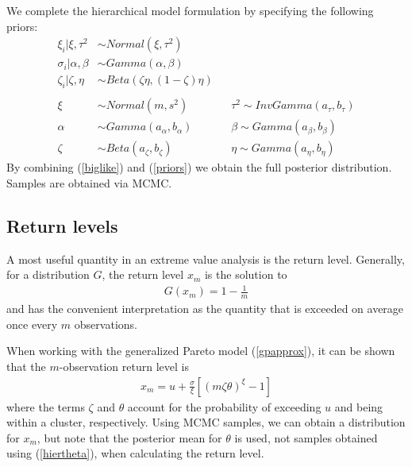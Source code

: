 \documentclass[12pt]{article}
\begin{document}
We complete the hierarchical model formulation by specifying the following priors:
\begin{align}
\xi_i|\xi, \tau^2  &\sim Normal(\xi, \tau^2) \nonumber \\
\sigma_i|\alpha, \beta &\sim Gamma(\alpha, \beta) \nonumber \\
\zeta_i|\zeta, \eta &\sim Beta(\zeta\eta, (1-\zeta)\eta) \nonumber \\
 \label{priors} \\
\xi &\sim Normal(m, s^2)&  &\tau^2 \sim InvGamma(a_\tau, b_\tau) \nonumber \\
\alpha &\sim Gamma(a_\alpha, b_\alpha)&  &\beta \sim Gamma(a_\beta, b_\beta) \nonumber \\
\zeta &\sim Beta(a_\zeta, b_\zeta)&  &\eta \sim Gamma(a_\eta, b_\eta) \nonumber
\end{align}
By combining (\ref{biglike}) and (\ref{priors}) we obtain the full posterior distribution. Samples are obtained via MCMC.



\subsection{Return levels}
\label{return}

A most useful quantity in an extreme value analysis is the return level. Generally, for a distribution $G$, the return level $x_m$ is the solution to
\begin{align}
G(x_m) = 1-\frac{1}{m}
\end{align}
and has the convenient interpretation as the quantity that is exceeded on average once every $m$ observations.

When working with the generalized Pareto model (\ref{gpapprox}), it can be shown that the $m$-observation return level is
\begin{align}
x_m = u +\frac{\sigma}{\xi}\left[\left(m\zeta\theta\right)^\xi-1\right] \label{rl}
\end{align}
where the terms $\zeta$ and $\theta$ account for the probability of exceeding $u$ and being within a cluster, respectively. Using MCMC samples, we can obtain a distribution for $x_m$, but note that the posterior mean for $\theta$ is used, not samples obtained using (\ref{hiertheta}), when calculating the return level.
\end{document}
